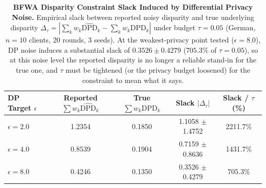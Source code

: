 \begin{table}[t]
\centering
\small
\caption{\textbf{BFWA Disparity Constraint Slack Induced by Differential Privacy Noise.}
Empirical slack between reported noisy disparity and true underlying disparity $\Delta_{\tau} = |\sum_k w_k \widehat{\text{DPD}}_k - \sum_k w_k \text{DPD}_k|$ under budget $\tau = 0.05$ (German, $n=10$ clients, 20 rounds, 3 seeds).
At the weakest-privacy point tested ($\epsilon = 8.0$), DP noise induces a substantial slack of $0.3526 \pm 0.4279$ ($705.3\%$ of $\tau = 0.05$), so at this noise level the reported disparity is no longer a reliable stand-in for the true one, and $\tau$ must be tightened (or the privacy budget loosened) for the constraint to mean what it says.}
\label{tab:bfwa_slack}
\begin{tabular}{lcccc}
\toprule
\textbf{DP Target $\epsilon$} & \textbf{Reported $\sum w_k \widehat{\text{DPD}}_k$} & \textbf{True $\sum w_k \text{DPD}_k$} & \textbf{Slack $|\Delta_{\tau}|$} & \textbf{Slack / $\tau$ (\%)} \\
\midrule
$\epsilon = 2.0$ & 1.2354 & 0.1850 & 1.1058 $\pm$ 1.4752 & 2211.7\% \\
$\epsilon = 4.0$ & 0.8539 & 0.1904 & 0.7159 $\pm$ 0.8636 & 1431.7\% \\
$\epsilon = 8.0$ & 0.4246 & 0.1350 & 0.3526 $\pm$ 0.4279 & 705.3\% \\
\bottomrule
\end{tabular}
\end{table}
